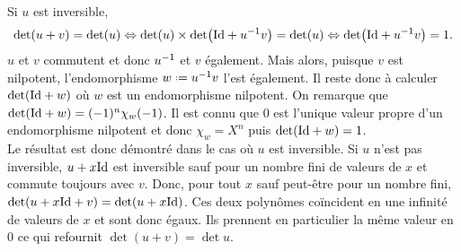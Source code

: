 \begin{solution}
    Si $u$ est inversible,
    $$\det(u+v) = \det(u) \Leftrightarrow \det(u) \times \det(\mathrm{Id} + u^{-1}v) = \det(u) \Leftrightarrow \det(\mathrm{Id} + u^{-1}v) = 1.$$
    $u$ et $v$ commutent et donc $u^{-1}$ et $v$ également. Mais alors, puisque $v$ est nilpotent, l'endomorphisme $w \defeq \Inv{u}v$ l'est également. Il reste donc à calculer $\det(\mathrm{Id} + w)$ où $w$ est un endomorphisme nilpotent. On remarque que $\det(\mathrm{Id} + w) = (-1)^n \chi_w(-1)$. Il est connu que $0$ est l'unique valeur propre d'un endomorphisme nilpotent et donc $\chi_w = X^n$ puis $\det(\mathrm{Id}+w) = 1$. \\
    Le résultat est donc démontré dans le cas où $u$ est inversible. Si $u$ n'est pas inversible, $u + x \mathrm{Id}$ est inversible sauf pour un nombre fini de valeurs de $x$ et commute toujours avec $v$. Donc, pour tout $x$ sauf peut-être pour un nombre fini, $\det(u + x \mathrm{Id} + v) = \det(u + x \mathrm{Id})$. Ces deux polynômes coïncident en une infinité de valeurs de $x$ et sont donc égaux. Ils prennent en particulier la même valeur en $0$ ce qui refournit $\det(u+v) = \det u$.
\end{solution}

